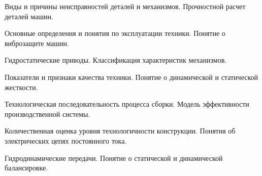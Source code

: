 \documentclass[
	14pt,
	a4paper,
	]
	{scrartcl}
\begin{document}
\vfill

\newpage


\shapk
{}
\setcounter{zad}{0}

\vfill
\z Виды и причины неисправностей деталей и механизмов.
 \vfill
\z Прочностной расчет деталей машин.
 \vfill

\vfill

\newpage


\shapk
{}
\setcounter{zad}{0}

\vfill
\z Основные определения и понятия по эксплуатации техники.
 \vfill
\z Понятие о виброзащите машин.
 \vfill

\vfill

\newpage


\shapk
{}
\setcounter{zad}{0}

\vfill
\z Гидростатические приводы.
 \vfill
\z Классификация характеристик механизмов.
 \vfill

\vfill

\newpage


\shapk
{}
\setcounter{zad}{0}

\vfill
\z Показатели и признаки качества техники.
 \vfill
\z Понятие о динамической и статической жесткости.
 \vfill

\vfill

\newpage


\shapk
{}
\setcounter{zad}{0}

\vfill
\z Технологическая последовательность процесса сборки.
 \vfill
\z Модель эффективности производственной системы.
 \vfill

\vfill

\newpage


\shapk
{}
\setcounter{zad}{0}

\vfill
\z Количественная оценка уровня технологичности конструкции.
 \vfill
\z Понятия об электрических цепях постоянного тока.
 \vfill

\vfill

\newpage


\shapk
{}
\setcounter{zad}{0}

\vfill
\z Гидродинамические передачи.
 \vfill
\z Понятие о статической и динамической балансировке.
 \vfill

\vfill

\newpage


\shapk
{}
\setcounter{zad}{0}
\end{document}
